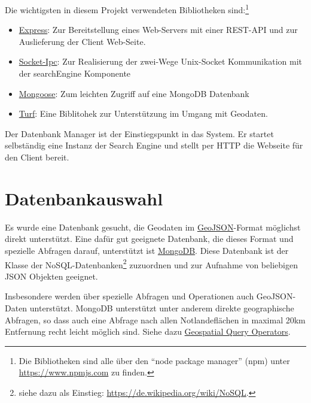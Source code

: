 \documentclass[10pt,a4paper]{report}
\begin{document}
Die wichtigsten in diesem Projekt verwendeten Bibliotheken sind:\footnote{Die Bibliotheken sind alle über den "`node package manager"' (npm) unter \href{https://www.npmjs.com}{https://www.npmjs.com} zu finden.}
\begin{itemize}
	\item \href{https://www.npmjs.com/package/express}{Express}: Zur Bereitstellung eines Web-Servers mit einer REST-API und zur Auslieferung der Client Web-Seite.
	\item \href{https://www.npmjs.com/package/socket-ipc}{Socket-Ipc}: Zur Realisierung der zwei-Wege Unix-Socket Kommunikation mit der searchEngine Komponente
	\item \href{https://www.npmjs.com/package/mongoose}{Mongoose}: Zum leichten Zugriff auf eine MongoDB Datenbank
	\item \href{https://www.npmjs.com/package/turf}{Turf}: Eine Biblitohek zur Unterstützung im Umgang mit Geodaten. 
\end{itemize}

Der Datenbank Manager ist der Einstiegspunkt in das System. Er startet selbständig eine Instanz der Search Engine und stellt per HTTP die Webseite für den Client bereit.

\section{Datenbankauswahl}

Es wurde eine Datenbank gesucht, die Geodaten im \href{http://geojson.org/}{GeoJSON}-Format möglichst direkt unterstützt. Eine dafür gut geeignete Datenbank, die dieses Format und spezielle Abfragen darauf, unterstützt ist \href{https://docs.mongodb.com/}{MongoDB}. Diese Datenbank ist der Klasse der NoSQL-Datenbanken\footnote{siehe dazu als Einstieg: \href{https://de.wikipedia.org/wiki/NoSQL}{https://de.wikipedia.org/wiki/NoSQL}.} zuzuordnen und zur Aufnahme von beliebigen JSON Objekten geeignet. 

Insbesondere werden über spezielle Abfragen und Operationen auch GeoJSON-Daten unterstützt.
MongoDB unterstützt unter anderem direkte geographische Abfragen, so dass auch eine Abfrage nach allen Notlandeflächen in maximal 20km Entfernung recht leicht möglich sind. Siehe dazu \href{https://docs.mongodb.com/manual/reference/operator/query-geospatial/}{Geospatial Query Operators}.
\end{document}
